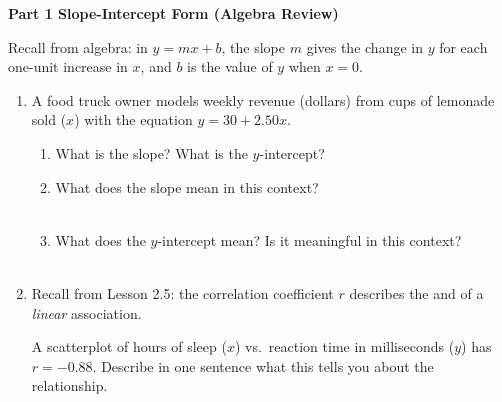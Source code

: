 \documentclass[10pt]{article}
\begin{document}
\namedateperiod

\vspace{0.3in}

{\large\bfseries\color{navy} Part 1 \quad Slope-Intercept Form (Algebra Review)}

\vspace{0.12in}
\noindent Recall from algebra: in $y = mx + b$, the slope $m$ gives the change in $y$ for
each one-unit increase in $x$, and $b$ is the value of $y$ when $x = 0$.

\vspace{0.1in}

\begin{enumerate}[leftmargin=1.6em, itemsep=0.22in]

  \item A food truck owner models weekly revenue (dollars) from cups of lemonade sold ($x$) with
        the equation $y = 30 + 2.50x$.

        \begin{enumerate}[label=\textbf{(\alph*)}, leftmargin=1.6em, itemsep=8pt]
          \item What is the slope? \blank{3cm} \quad What is the $y$-intercept? \blank{3cm}

          \item What does the slope mean in this context?\\[8pt]
                \writeline\\[1pt]\writeline

          \item What does the $y$-intercept mean? Is it meaningful in this context?\\[8pt]
                \writeline\\[1pt]\writeline
        \end{enumerate}

  \item Recall from Lesson 2.5: the correlation coefficient $r$ describes the
        \blank{3.5cm} and \blank{3.5cm} of a \textit{linear} association.

        \vspace{8pt}
        A scatterplot of hours of sleep ($x$) vs.\ reaction time in milliseconds ($y$) has
        $r = -0.88$. Describe in one sentence what this tells you about the relationship.\\[8pt]
        \writeline\\[1pt]\writeline

\end{enumerate}
\end{document}
